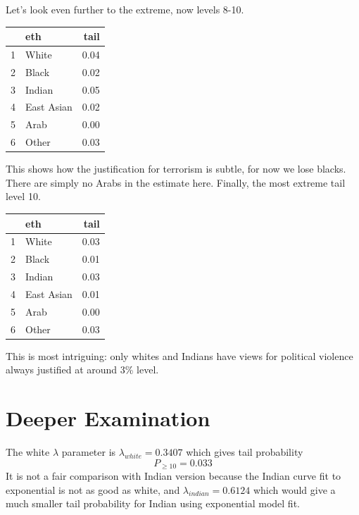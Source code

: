 \documentclass{amsart}
\begin{document}
Let's look even further to the extreme, now levels 8-10.

\begin{table}[ht]
\centering
\begin{tabular}{rlr}
  \hline
 & eth & tail \\ 
  \hline
1 & White & 0.04 \\ 
  2 & Black & 0.02 \\ 
  3 & Indian & 0.05 \\ 
  4 & East Asian & 0.02 \\ 
  5 & Arab & 0.00 \\ 
  6 & Other & 0.03 \\ 
   \hline
\end{tabular}
\end{table}

This shows how the justification for terrorism is subtle, for now we lose blacks.  There are simply no Arabs in the estimate here.  Finally, the most extreme tail level 10.

\begin{table}[ht]
\centering
\begin{tabular}{rlr}
  \hline
 & eth & tail \\ 
  \hline
1 & White & 0.03 \\ 
  2 & Black & 0.01 \\ 
  3 & Indian & 0.03 \\ 
  4 & East Asian & 0.01 \\ 
  5 & Arab & 0.00 \\ 
  6 & Other & 0.03 \\ 
   \hline
\end{tabular}
\end{table}

This is most intriguing: only whites and Indians have views for political violence always justified at around 3\% level.

\section{Deeper Examination}

The white $\lambda$ parameter is $\lambda_{white} = 0.3407$ which gives tail probability
\[
P_{\ge 10} = 0.033
\]
It is not a fair comparison with Indian version because the Indian curve fit to exponential is not as good as white, and $\lambda_{indian} = 0.6124$ which would give a much smaller tail probability for Indian using exponential model fit.  
\end{document}
